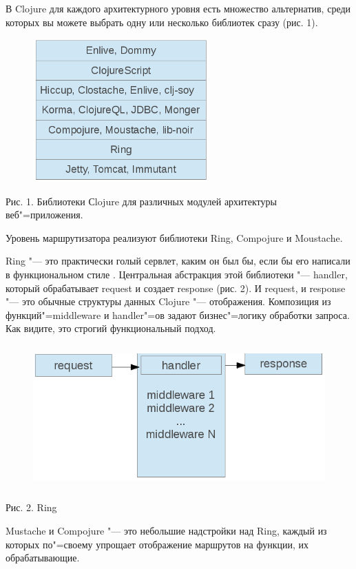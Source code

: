 \documentclass[10pt, a5paper]{article}
\begin{document}
В Clojure для каждого архитектурного уровня есть множество альтернатив, среди которых вы можете выбрать одну или несколько библиотек сразу (рис. 1).

\begin{figure} [h!]
  \centering
  \includegraphics[height=5.5cm]{119_2013_w_figure1}
\end{figure}

Рис. 1. Библиотеки Сlojure для различных модулей архитектуры веб"=приложения.

Уровень маршрутизатора реализуют библиотеки Ring, Compojure и Moustache.

Ring "--- это практически голый сервлет, каким он был бы, если бы его написали в функциональном стиле \cite{Bushenko3}. Центральная абстракция этой библиотеки "--- handler, который обрабатывает request и создает response (рис. 2). И request, и response "--- это обычные структуры данных Clojure "--- отображения. Композиция из функций"=middleware и handler"=ов задают бизнес"=логику обработки запроса. Как видите, это строгий функциональный подход.

\begin{figure}[h!]
  \centering
  \includegraphics[height=5.5cm]{119_2013_w_figure2}
\end{figure}

Рис. 2. Ring

Mustache и Compojure "--- это небольшие надстройки над Ring, каждый из которых по"=своему упрощает отображение маршрутов на функции, их обрабатывающие.
\end{document}
